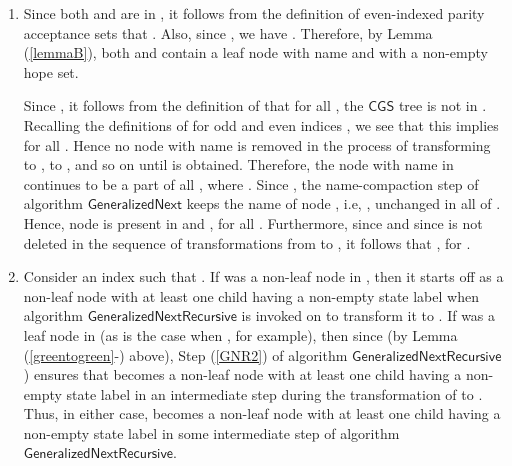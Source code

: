 \documentclass[3p]{elsarticle}
\newcommand{\CGS}{\ensuremath{\textsf{CGS }}}
\newcommand{\algo}[1]{\ensuremath{\textsf{{#1}}}}
\begin{document}
\begin{enumerate}
\item Since both  and  are in , it follows from
  the definition of even-indexed parity acceptance sets that .  Also, since , we have .  Therefore, by Lemma (\ref{lemmaB}), both  and 
  contain a leaf node with name  and with a non-empty hope set.

  Since , it follows from the definition of  that
  for all , the \CGS tree  is not in
  .  Recalling the definitions of
   for odd and even indices , we see that this implies  for all .  Hence no node with
  name  is removed in the process of transforming  to
  ,  to , and so on until  is
  obtained.  Therefore, the node  with name  in 
  continues to be a part of all , where .  Since
  , the name-compaction step of algorithm
  \algo{GeneralizedNext} keeps the name of node , i.e, ,
  unchanged in all of .  Hence, node  is present in  and
  , for all .
  Furthermore, since  and since  is not
  deleted in the sequence of transformations from  to ,
  it follows that , for .

\item Consider an index  such that .  If  was a
  non-leaf node in , then it starts off as a non-leaf node
  with at least one child having a non-empty state label when
  algorithm \algo{GeneralizedNextRecursive} is invoked on  to
  transform it to .  If  was a leaf node in  (as is
  the case when , for example), then since  (by Lemma (\ref{greentogreen}-) above), Step
  (\ref{GNR2}) of algorithm \algo{GeneralizedNextRecursive}) ensures
  that  becomes a non-leaf node with at least one child having a
  non-empty state label in an intermediate step during the
  transformation of  to .  Thus, in either case, 
  becomes a non-leaf node with at least one child having a non-empty
  state label in some intermediate step of algorithm
  \algo{GeneralizedNextRecursive}.


\end{enumerate}
\end{document}
